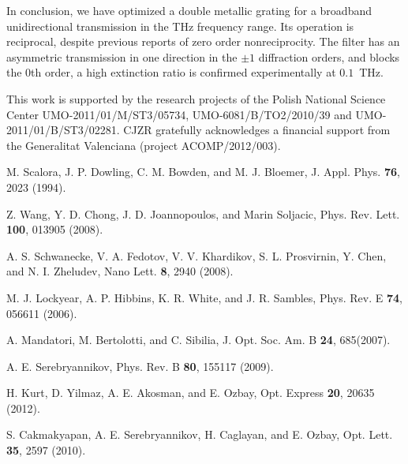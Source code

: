 \documentclass[10pt,letterpaper,twocolumn]{article} %
\begin{document}
In conclusion, we have optimized a double metallic grating for a broadband unidirectional transmission in the THz frequency range. Its operation is reciprocal, despite previous reports of zero order nonreciprocity.  The filter has an asymmetric transmission in one direction in the $\pm1$ diffraction orders, and blocks the $0$th order, a high extinction ratio is confirmed experimentally at $0.1$~THz.

This work is supported by the research projects of the Polish National Science Center
UMO-2011/01/M/ST3/05734, UMO-6081/B/TO2/2010/39 and UMO-2011/01/B/ST3/02281. CJZR gratefully acknowledges a financial support from the Generalitat Valenciana (project ACOMP/2012/003).

\bigskip



\begin{thebibliography}{10}
\newcommand{\enquote}[1]{``#1''}

M. Scalora, J. P. Dowling, C. M. Bowden, and M. J. Bloemer, 
J. Appl. Phys. \textbf{76}, 2023 (1994).

Z. Wang, Y. D. Chong, J. D. Joannopoulos, and Marin Soljacic, 
Phys. Rev. Lett. \textbf{100}, 013905 (2008).

A. S. Schwanecke, V. A. Fedotov, V. V. Khardikov, S. L. Prosvirnin, Y. Chen, and N. I. Zheludev,
Nano Lett. \textbf{8},  2940 (2008).

M. J. Lockyear, A. P. Hibbins, K. R. White, and J. R. Sambles,
Phys. Rev. E \textbf{74}, 056611 (2006).

A. Mandatori, M. Bertolotti, and C. Sibilia, 
J. Opt. Soc. Am. B \textbf{24}, 685(2007).

A. E. Serebryannikov, 
Phys. Rev. B \textbf{80}, 155117 (2009).

H. Kurt, D. Yilmaz, A. E. Akosman, and E. Ozbay, 
Opt. Express \textbf{20}, 20635 (2012). 

S. Cakmakyapan, A. E. Serebryannikov, H. Caglayan, and E. Ozbay, 
Opt. Lett. \textbf{35}, 2597 (2010). 


\end{thebibliography}
\end{document}
